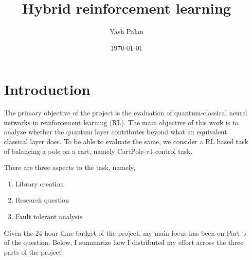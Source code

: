 \documentclass{article}
\title{Hybrid reinforcement learning}
\author{Yash Palan}
\date{\today}
\begin{document}
\maketitle
\section{Introduction}
\par
The primary objective of the project is the evaluation of quantum-classical neural networks in reinforcement learning (RL). The main objective of this work is to analyze whether the quantum layer contributes beyond what an equivalent classical layer does. To be able to evaluate the same, we consider a RL based task of balancing a pole on a cart, namely CartPole-v1 control task. \\
\par
There are three aspects to the task, namely,
\begin{enumerate}
    \item Library creation
    \item Research question
    \item Fault tolerant analysis
\end{enumerate} 
Given the 24 hour time budget of the project, my main focus has been on Part b of the question. Below, I summarize how I distributed my effort across the three parts of the project
\end{document}
